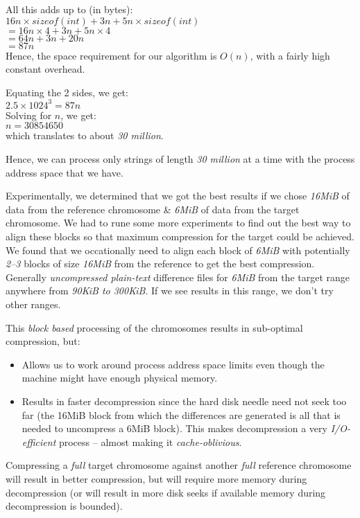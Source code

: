 \documentclass[11pt]{article}
\begin{document}
All this adds up to (in bytes):\\
$16n \times sizeof(int) + 3n + 5n \times sizeof(int)$\\
$= 16n \times 4 + 3n + 5n \times 4$\\
$= 64n + 3n + 20n$\\
$= 87n$\\

Hence, the space requirement for our algorithm is $O(n)$, with a
fairly high constant overhead.

Equating the 2 sides, we get:\\
$2.5 \times 1024^3 = 87n$\\
Solving for $n$, we get:\\
$n = 30854650$\\
which translates to about \textit{30 million}.

Hence, we can process only strings of length \textit{30 million} at a
time with the process address space that we have.

Experimentally, we determined that we got the best results if we chose
\textit{16MiB} of data from the reference chromosome \& \textit{6MiB} of
data from the target chromosome. We had to rune some more experiments
to find out the best way to align these blocks so that maximum
compression for the target could be achieved. We found that we
occationally need to align each block of \textit{6MiB} with
potentially \textit{2--3} blocks of size \textit{16MiB} from the
reference to get the best compression. Generally \textit{uncompressed
  plain-text} difference files for \textit{6MiB} from the target range
anywhere from {\textit{90KiB to 300KiB}}. If we see results in this
range, we don't try other ranges.

This \textit{block based} processing of the chromosomes results in
sub-optimal compression, but:
\begin{itemize}
\item Allows us to work around process address space limits even
  though the machine might have enough physical memory.
\item Results in faster decompression since the hard disk needle need
  not seek too far (the 16MiB block from which the differences are
  generated is all that is needed to uncompress a 6MiB block). This
  makes decompression a very \textit{I/O-efficient} process -- almost
  making it \textit{cache-oblivious}.
\end{itemize}

Compressing a \textit{full} target chromosome against another
\textit{full} reference chromosome will result in better compression,
but will require more memory during decompression (or will result in
more disk seeks if available memory during decompression is bounded).
\end{document}
